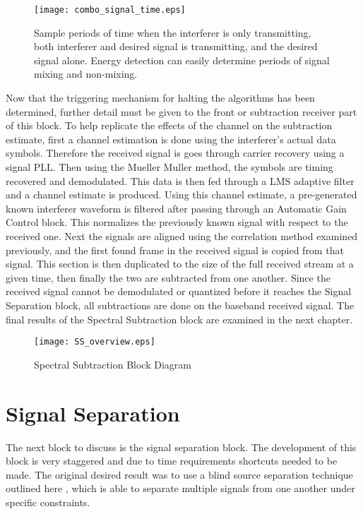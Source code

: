 \begin{figure}[!ht]\label{fig:combo_signal_time}
\centering
\texttt{[image: combo\_signal\_time.eps]}
\caption{Sample periods of time when the interferer is only transmitting, both interferer and desired signal is transmitting, and the desired signal alone.  Energy detection can easily determine periods of signal mixing and non-mixing.}
\end{figure}


Now that the triggering mechanism for halting the algorithms has been determined, further detail must be given to the front or subtraction receiver part of this block.  To help replicate the effects of the channel on the subtraction estimate, first a channel estimation is done using the interferer's actual data symbols.  Therefore the received signal is goes through carrier recovery using a signal PLL.  Then using the Mueller Muller method, the symbols are timing recovered and demodulated.  This data is then fed through a LMS adaptive filter and a channel estimate is produced.  Using this channel estimate, a pre-generated known interferer waveform is filtered after passing through an Automatic Gain Control block. This normalizes the previously known signal with respect to the received one.  Next the signals are aligned using the correlation method examined previously, and the first found frame in the received signal is copied from that signal.  This section is then duplicated to the size of the full received stream at a given time, then finally the two are subtracted from one another.  Since the received signal cannot be demodulated or quantized before it reaches the Signal Separation block, all subtractions are done on the baseband received signal.  The final results of the Spectral Subtraction block are examined in the next chapter.\\

\begin{figure}[!ht]\label{ss_overview}
\centering
\texttt{[image: SS\_overview.eps]}
\caption{Spectral Subtraction Block Diagram}
\end{figure}


\section{Signal Separation}

The next block to discuss is the signal separation block.  The development of this block is very staggered and due to time requirements shortcuts needed to be made.  The original desired result was to use a blind source separation technique outlined here \cite{AMUSE}, which is able to separate multiple signals from one another under specific constraints.  %

